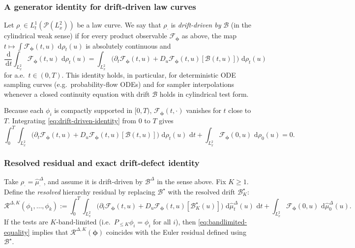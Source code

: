 \documentclass{article}
\numberwithin{equation}{section}
\theoremstyle{plain}
\theoremstyle{definition}
\theoremstyle{remark}
\newcommand{\Pcal}{\mathcal{P}}
\newcommand{\dd}{\,\mathrm{d}}
\begin{document}
\subsubsection{A generator identity for drift-driven law curves}

Let $\rho_\cdot\in L^1_t(\Pcal(L^2_x))$ be a law curve.
We say that $\rho_\cdot$ is \emph{drift-driven by} $\mathcal B$ (in the cylindrical weak sense) if for every product observable
$\mathcal F_{\boldsymbol\phi}$ as above, the map $t\mapsto \int\mathcal F_{\boldsymbol\phi}(t,u)\,\dd\rho_t(u)$ is absolutely continuous and
\begin{equation}\label{eq:drift-driven-identity}
\frac{\dd}{\dd t}\int_{L^2_x}\mathcal F_{\boldsymbol\phi}(t,u)\,\dd\rho_t(u)
=
\int_{L^2_x}\Big(\partial_t\mathcal F_{\boldsymbol\phi}(t,u)+D_u\mathcal F_{\boldsymbol\phi}(t,u)[\mathcal B(t,u)]\Big)\,\dd\rho_t(u)
\end{equation}
for a.e.\ $t\in(0,T)$.
This identity holds, in particular, for deterministic ODE sampling curves (e.g.\ probability-flow ODEs) and for sampler
interpolations whenever a closed continuity equation with drift $\mathcal B$ holds in cylindrical test form.

Because each $\phi_i$ is compactly supported in $[0,T)$, $\mathcal F_{\boldsymbol\phi}(t,\cdot)$ vanishes for $t$ close to $T$.
Integrating \eqref{eq:drift-driven-identity} from $0$ to $T$ gives
\begin{equation}\label{eq:drift-driven-integrated}
\int_0^T\int_{L^2_x}\Big(\partial_t\mathcal F_{\boldsymbol\phi}(t,u)+D_u\mathcal F_{\boldsymbol\phi}(t,u)[\mathcal B(t,u)]\Big)\,\dd\rho_t(u)\,\dd t
+\int_{L^2_x}\mathcal F_{\boldsymbol\phi}(0,u)\,\dd\rho_0(u)
=0.
\end{equation}

\subsubsection{Resolved residual and exact drift-defect identity}

Take $\rho_\cdot=\widehat\mu^\Delta_\cdot$, and assume it is drift-driven by $\mathcal B^\Delta$ in the sense above.
Fix $K\ge 1$. Define the \emph{resolved} hierarchy residual by replacing $\mathcal B^\star$ with the resolved drift $\mathcal B^\star_K$:
\begin{equation}\label{eq:residual-lawlevel-resolved}
\mathcal R^{\Delta,K}(\phi_1,\dots,\phi_k)
:=
\int_0^T\int_{L^2_x}\Big(\partial_t\mathcal F_{\boldsymbol\phi}(t,u)+D_u\mathcal F_{\boldsymbol\phi}(t,u)[\mathcal B^\star_K(u)]\Big)\,\dd\widehat\mu^\Delta_t(u)\,\dd t
+\int_{L^2_x}\mathcal F_{\boldsymbol\phi}(0,u)\,\dd\widehat\mu^\Delta_0(u).
\end{equation}
If the tests are $K$-band-limited (i.e.\ $P_{\le K}\phi_i=\phi_i$ for all $i$), then \eqref{eq:bandlimited-equality} implies that
$\mathcal R^{\Delta,K}(\boldsymbol\phi)$ coincides with the Euler residual defined using $\mathcal B^\star$.
\end{document}
